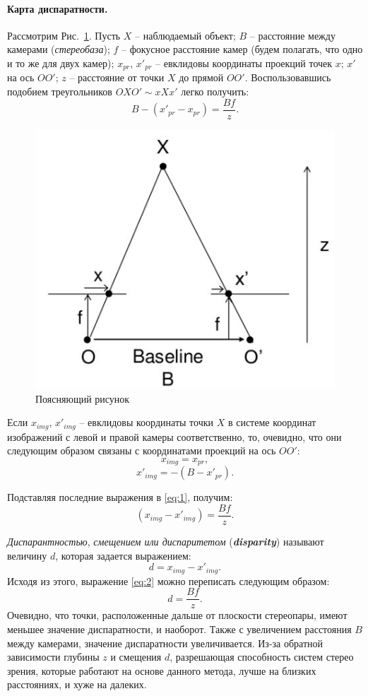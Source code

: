 \documentclass[oneside,final,12pt]{scrartcl}
\begin{document}
			\paragraph{Карта диспаратности.} Рассмотрим Рис.~\ref{fig:stereodepth}. Пусть \(X\) -- наблюдаемый объект; \(B\) -- расстояние между камерами (\textit{стереобаза}); \(f\) -- фокусное расстояние камер (будем полагать, что одно и то же для двух камер); \(x_{pr}\), \(x'_{pr}\)  -- евклидовы координаты проекций точек \(x\); \(x'\) на ось \(OO'\); \(z\) -- расстояние от точки \(X\) до прямой \(OO'\). Воспользовавшись подобием треугольников \(OXO' \sim xXx'\) легко получить:
			\begin{equation}
			B-\left(x'_{pr}-x_{pr}\right) = \frac{Bf}{z}.
			\label{eq:1}
			\end{equation}

			\begin{figure}[h]
				\centering
				\includegraphics[width=0.4\linewidth]{stereo_depth.jpg}
				\caption{Поясняющий рисунок}
				\label{fig:stereodepth}
			\end{figure}

			Если \(x_{img}\), \(x'_{img}\) -- евклидовы координаты точки \(X\) в системе координат изображений с левой и правой камеры соответственно, то, очевидно, что они следующим образом связаны с координатами проекций на ось \(OO'\):
			\[ x_{img} = x_{pr}, \]
			\[ x'_{img} = -\left(B - x'_{pr}\right). \]

			Подставляя последние выражения в \eqref{eq:1}, получим:
			\begin{equation}
			\left( x_{img}-x'_{img} \right) = \frac{Bf}{z}.
			\label{eq:2}
			\end{equation}

			\textit{Диспарантностью}, \textit{смещением или диспаритетом} (\textbf{\textit{disparity}}) называют величину \(d\), которая задается выражением:
			\begin{equation}
			d = x_{img}-x'_{img}.
			\label{eq:d_x}
			\end{equation}
			Исходя из этого, выражение \eqref{eq:2} можно переписать следующим образом:
			\begin{equation}
			d = \frac{Bf}{z}.
			\label{eq:d_z}
			\end{equation}
			Очевидно, что точки, расположенные дальше от плоскости стереопары, имеют меньшее значение диспаратности, и наоборот. Также с увеличением расстояния \(B\) между камерами, значение диспаратности увеличивается. Из-за обратной зависимости глубины \(z\) и смещения \(d\), разрешающая способность систем стерео зрения, которые работают на основе данного метода, лучше на близких расстояниях, и хуже на далеких.
\end{document}
